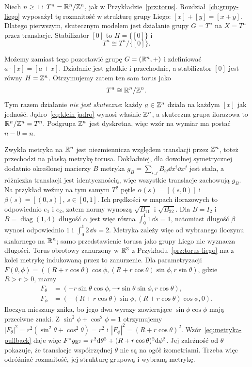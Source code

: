 \begin{przyklad}
\label{prz:klein-torus}
Niech $n\geq1$ i $T^n=\mathbb{R}^n/\mathbb{Z}^n$, jak w
Przykładzie~\ref{prz:torus}. Rozdział~\ref{ch:grupy-liego}
wyposażył tę rozmaitość w strukturę grupy Liego:
$[x]+[y]=[x+y]$. Dlatego pierwszym, skutecznym modelem
jest działanie grupy $G=T^n$ na $X=T^n$ przez translacje.
Stabilizator $[0]$ to $H=\{[0]\}$ i
\[
 T^n\cong T^n/\{[0]\}.
\]

Możemy zamiast tego pozostawić grupę $G=(\mathbb{R}^n,+)$ i
zdefiniować $a\cdot[x]=[a+x]$. Działanie jest gładkie
i przechodnie, a stabilizator $[0]$ jest równy
$H=\mathbb{Z}^n$. Otrzymujemy zatem ten sam torus jako
\[
 T^n\cong\mathbb{R}^n/\mathbb{Z}^n.
\]
Tym razem działanie \emph{nie jest skuteczne}: każdy
$a\in\mathbb{Z}^n$ działa na każdym $[x]$ jak jedność.
Jądro~\eqref{eq:klein-jadro} wynosi właśnie $\mathbb{Z}^n$,
a skuteczna grupa ilorazowa to $\mathbb{R}^n/\mathbb{Z}^n=T^n$.
Podgrupa $\mathbb{Z}^n$ jest dyskretna, więc wzór na wymiar
ma postać $n-0=n$.

Zwykła metryka na $\mathbb{R}^n$ jest niezmiennicza względem
translacji przez $\mathbb{Z}^n$, toteż przechodzi na płaską
metrykę torusa. Dokładniej, dla dowolnej symetrycznej
dodatnio określonej macierzy $B$ metryka
$g_B=\sum_{i,j}B_{ij}\dd x^i\dd x^j$ jest stała,
a różniczka translacji jest identycznością,
więc wszystkie translacje zachowują $g_B$.
Na przykład weźmy na tym samym $T^2$ pętle
$\alpha(s)=[(s,0)]$ i $\beta(s)=[(0,s)]$, $s\in[0,1]$.
Ich prędkości w mapach ilorazowych to odpowiednio
$e_1$ i $e_2$, zatem normy wynoszą $\sqrt{B_{11}}$
i $\sqrt{B_{22}}$.
Dla $B=I_2$ i $B=\operatorname{diag}(1,4)$ długość
$\alpha$ jest więc równa $\int_0^1 1\,\dd s=1$,
natomiast długość $\beta$ wynosi odpowiednio $1$
i $\int_0^1 2\,\dd s=2$.
Metryka zależy więc od wybranego iloczynu
skalarnego na $\mathbb{R}^n$; samo przedstawienie torusa jako
grupy Liego nie wyznacza długości. Torus obrotowy
zanurzony w $\mathbb{R}^3$ z Przykładu~\ref{prz:torus-liego}
ma z kolei metrykę indukowaną przez to zanurzenie.
Dla parametryzacji
$F(\theta,\phi)=((R+r\cos\theta)\cos\phi,
(R+r\cos\theta)\sin\phi,r\sin\theta)$, gdzie $R>r>0$, mamy
\begin{align*}
 F_\theta&=(-r\sin\theta\cos\phi,-r\sin\theta\sin\phi,r\cos\theta),\\
 F_\phi&=(-(R+r\cos\theta)\sin\phi,(R+r\cos\theta)\cos\phi,0).
\end{align*}
Iloczyn mieszany znika, bo jego dwa wyrazy zawierające
$\sin\phi\cos\phi$ mają przeciwne znaki.
Z $\sin^2\phi+\cos^2\phi=1$ otrzymujemy
$|F_\theta|^2=r^2(\sin^2\theta+\cos^2\theta)=r^2$
i $|F_\phi|^2=(R+r\cos\theta)^2$.
Wzór~\eqref{eq:metryka-pullback} daje więc
$F^*g_{\mathbb{R}^3}=r^2\mathrm d\theta^2+(R+r\cos\theta)^2\mathrm d\phi^2$.
Jej zależność od $\theta$ pokazuje, że translacje współrzędnej
$\theta$ nie są na ogół izometriami.
Trzeba więc odróżniać
rozmaitość, jej strukturę grupową i wybraną metrykę.
\end{przyklad}

